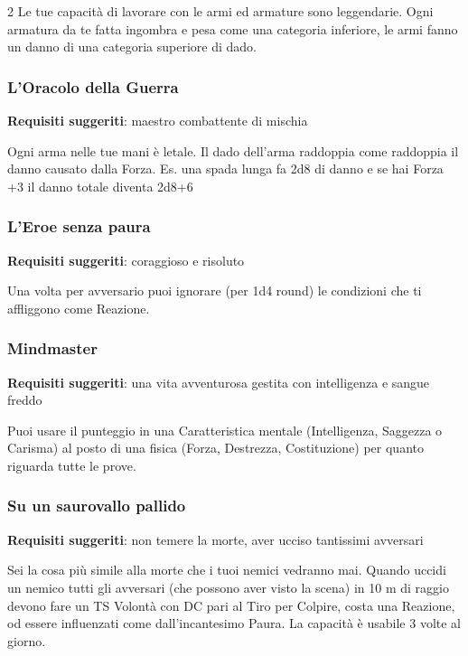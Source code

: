 \begin{multicols}{2}
Le tue capacità di lavorare con le armi ed armature sono leggendarie.
Ogni armatura da te fatta ingombra e pesa come una categoria inferiore, le armi fanno un danno di una categoria superiore di dado.

\subsubsection{L'Oracolo della Guerra}

\textbf{Requisiti suggeriti}: maestro combattente di mischia

Ogni arma nelle tue mani è letale. Il dado dell'arma raddoppia come raddoppia il danno causato dalla Forza. Es. una spada lunga fa 2d8 di danno e se hai Forza +3 il danno totale diventa 2d8+6

\subsubsection{L'Eroe senza paura}

\textbf{Requisiti suggeriti}: coraggioso e risoluto

Una volta per avversario puoi ignorare (per 1d4 round) le condizioni che ti affliggono come Reazione.

\subsubsection{Mindmaster}

\textbf{Requisiti suggeriti}: una vita avventurosa gestita con intelligenza e sangue freddo

Puoi usare il punteggio in una Caratteristica mentale (Intelligenza, Saggezza o Carisma) al posto di una fisica (Forza, Destrezza, Costituzione) per quanto riguarda tutte le prove.

\subsubsection*{Su un saurovallo pallido}

\textbf{Requisiti suggeriti}: non temere la morte, aver ucciso tantissimi avversari

Sei la cosa più simile alla morte che i tuoi nemici vedranno mai.
Quando uccidi un nemico tutti gli avversari (che possono aver visto la scena) in 10 m di raggio devono fare un TS Volontà con DC pari al Tiro per Colpire, costa una Reazione, od essere influenzati come dall'incantesimo Paura. La capacità è usabile 3 volte al giorno.


\end{multicols}
